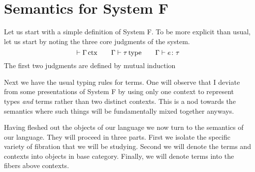 \section{Semantics for System F}

Let us start with a simple definition of System F. To be more explicit
than usual, let us start by noting the three core judgments of the
system.
\[
  \vdash \Gamma\,\mathrm{ctx} \qquad \Gamma \vdash \tau\,\mathrm{type} \qquad \Gamma \vdash e \colon \tau
\]
The first two judgments are defined by mutual induction

Next we have the usual typing rules for terms. One will observe that I
deviate from some presentations of System F by using only one context
to represent types \emph{and} terms rather than two distinct
contexts. This is a nod towards the semantics where such things will
be fundamentally mixed together anyways.


Having fleshed out the objects of our language we now turn to the
semantics of our language. They will proceed in three parts. First we
isolate the specific variety of fibration that we will be
studying. Second we will denote the terms and contexts into objects in
base category. Finally, we will denote terms into the fibers above
contexts.
